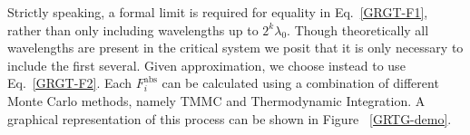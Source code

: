 \documentclass[12pt]{article}
\begin{document}
Strictly speaking, a formal limit is required for equality in Eq.~\ref{GRGT-F1}, rather than only including wavelengths up to $2^k\lambda_0$. Though theoretically all wavelengths are present in the critical system we posit that it is only necessary to include the first several. Given approximation, we choose instead to use Eq.~\ref{GRGT-F2}. Each $F^{\text{abs}}_i$ can be calculated using a combination of different Monte Carlo methods, namely TMMC and Thermodynamic Integration. A graphical representation of this process can be shown in Figure ~\ref{GRTG-demo}.\\




\begin{figure}
\centering
\end{figure}
\end{document}
